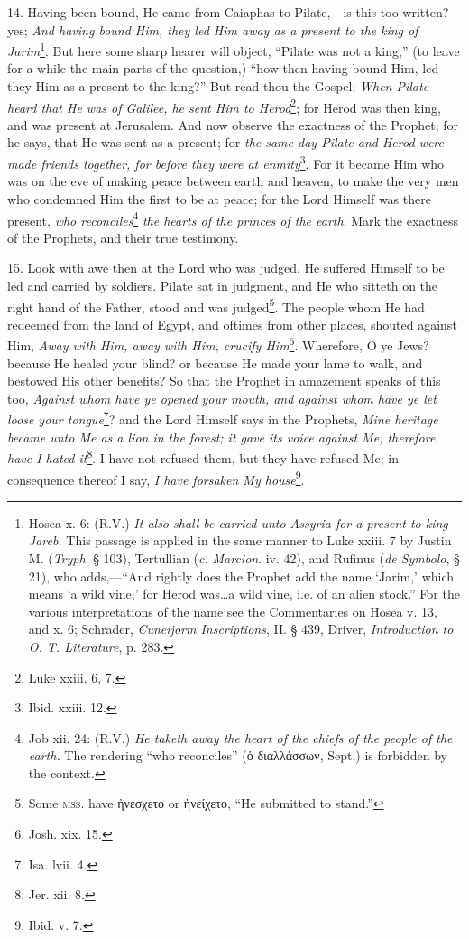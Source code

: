 14. Having been bound, He came from Caiaphas to Pilate,—is this too written? yes; \emph{And having bound Him, they led Him away as a present to the king of Jarim}\footnote{Hosea x. 6: (R.V.) \emph{It also shall be carried unto Assyria for a present to king Jareb.} This passage is applied in the same manner to Luke xxiii. 7 by Justin M. (\emph{Tryph}. § 103), Tertullian (\emph{c.} \emph{Marcion}. iv. 42), and Rufinus (\emph{de Symbolo}, § 21), who adds,—“And rightly does the Prophet add the name ‘Jarim,’ which means ‘a wild vine,’ for Herod was…a wild vine, i.e. of an alien stock.” For the various interpretations of the name see the Commentaries on Hosea v. 13, and x. 6; Schrader, \emph{Cuneijorm Inscriptions}, II. § 439, Driver, \emph{Introduction to O. T. Literature}, p. 283.}. But here some sharp hearer will object, “Pilate was not a king,” (to leave for a while the main parts of the question,) “how then having bound Him, led they Him as a present to the king?” But read thou the Gospel; \emph{When Pilate heard that He was of Galilee, he sent Him to Herod}\footnote{Luke xxiii. 6, 7.}; for Herod was then king, and was present at Jerusalem. And now observe the exactness of the Prophet; for he says, that He was sent as a present; for \emph{the same day Pilate and Herod were made friends together, for before they were at enmity}\footnote{Ibid. xxiii. 12.}. For it became Him who was on the eve of making peace between earth and heaven, to make the very men who condemned Him the first to be at peace; for the Lord Himself was there present, \emph{who reconciles}\footnote{Job xii. 24: (R.V.) \emph{He taketh away the heart of the chiefs of the people of the earth.} The rendering “who reconciles” (\textgreek{ὁ διαλλάσσων,} Sept.) is forbidden by the context.} \emph{the hearts of the princes of the earth}. Mark the exactness of the Prophets, and their true testimony.

15. Look with awe then at the Lord who was judged. He suffered Himself to be led and carried by soldiers. Pilate sat in judgment, and He who sitteth on the right hand of the Father, stood and was judged\footnote{Some \textsc{mss.} have \textgreek{ἠνεσχετο} or \textgreek{ἠνείχετο}, “He submitted to stand.”}. The people whom He had redeemed from the land of Egypt, and oftimes from other places, shouted against Him, \emph{Away with Him, away with Him, crucify Him}\footnote{Josh. xix. 15.}. Wherefore, O ye Jews? because He healed your blind? or because He made your lame to walk, and bestowed His other benefits? So that the Prophet in amazement speaks of this too, \emph{Against whom have ye opened your mouth, and against whom have ye let loose your tongue}\footnote{Isa. lvii. 4.}? and the Lord Himself says in the Prophets, \emph{Mine heritage became unto Me as a lion in the forest; it gave its voice against Me; therefore have I hated it}\footnote{Jer. xii. 8.}. I have not refused them, but they have refused Me; in consequence thereof I say, \emph{I have forsaken My house}\footnote{Ibid. v. 7.}.

